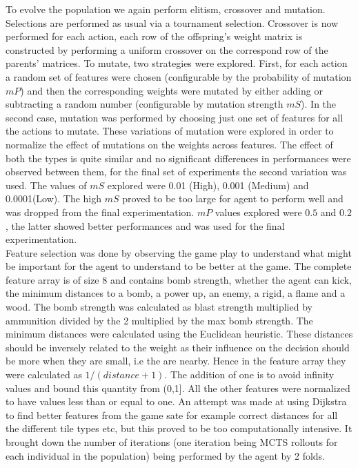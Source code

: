 \documentclass{llncs}
\begin{document}
\noindent
To evolve the population we again perform elitism, crossover and mutation. Selections are performed as usual via a tournament selection. Crossover is now performed for each action, each row of the offspring's weight matrix is constructed by performing a uniform crossover on the correspond row of the parents' matrices. To mutate, two strategies were explored. First, for each action a random set of features were chosen (configurable by the probability of mutation $mP$) and then the corresponding weights were mutated by either adding or subtracting a random number (configurable by mutation strength $mS$). In the second case, mutation was performed by choosing just one set of features for all the actions to mutate. These variations of mutation were explored in order to normalize the effect of mutations on the weights across features. The effect of both the types is quite similar and no significant differences in performances were observed between them, for the final set of experiments the second variation was used. The values of $mS$ explored were 0.01 (High), 0.001 (Medium) and 0.0001(Low). The high $mS$ proved to be too large for agent to perform well and was dropped from the final experimentation. $mP$ values explored were $0.5$ and $0.2$, the latter showed better performances and was used for the final experimentation.\\

\noindent
Feature selection was done by observing the game play to understand what might be important for the agent to understand to be better at the game. The complete feature array is of size 8 and contains bomb strength, whether the agent can kick,  the minimum distances to a bomb, a power up, an enemy, a rigid, a flame and a wood. The bomb strength was calculated as blast strength multiplied by ammunition divided by the 2 multiplied by the max bomb strength. The minimum distances were calculated using the Euclidean heuristic. These distances should be inversely related to the weight as their influence on the decision should be more when they are small, i.e the are nearby. Hence in the feature array they were calculated as $1/(distance +1)$. The addition of one is to avoid infinity values and bound this quantity from (0,1]. All the other features were normalized to have values less than or equal to one. An attempt was made at using Dijkstra to find better features from the game sate for example correct distances for all the different tile types etc, but this proved to be too computationally intensive. It brought down the number of iterations (one iteration being MCTS rollouts for each individual in the population) being performed by the agent by 2 folds.\\
\end{document}
